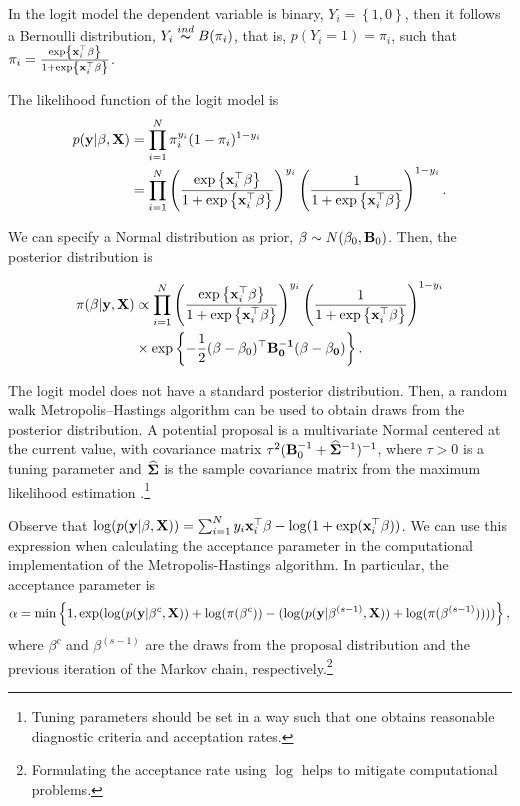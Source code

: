 In the logit model the dependent variable is binary, $Y_i=\left\{1,0\right\}$, then it follows a Bernoulli distribution, $Y_i\stackrel{ind} {\thicksim}B(\pi_i)$, that is, $p(Y_i=1)=\pi_i$, such that $\pi_i=\frac{\exp\left\{{\bf{x}}_i^{\top}\beta\right\}}{1+\exp\left\{{\bf{x}}_i^{\top}\beta\right\}}$.

The likelihood function of the logit model is
\begin{align*}
	p({\bf{y}}|\beta,{\bf{X}})&=\prod_{i=1}^N \pi_i^{y_i}(1-\pi_i)^{1-y_i}\\
	&=\prod_{i=1}^N\left(\frac{\exp\left\{{\bf{x}}_i^{\top}\beta\right\}}{1+\exp\left\{{\bf{x}}_i^{\top}\beta\right\}}\right)^{y_i}\left(\frac{1}{1+\exp\left\{{\bf{x}}_i^{\top}\beta\right\}}\right)^{1-y_i}.
\end{align*}

We can specify a Normal distribution as prior, $\beta\sim N({\bf{\beta}}_0,{\bf{B}}_0)$. Then, the posterior distribution is

\begin{align*}
	\pi(\beta|{\bf{y}},{\bf{X}})&\propto\prod_{i=1}^N\left(\frac{\exp\left\{{\bf{x}}_i^{\top}\beta\right\}}{1+\exp\left\{{\bf{x}}_i^{\top}\beta\right\}}\right)^{y_i}\left(\frac{1}{1+\exp\left\{{\bf{x}}_i^{\top}\beta\right\}}\right)^{1-y_i}\\
	&\times\exp\left\{-\frac{1}{2}(\beta-\beta_0)^{\top}\bf{B}_0^{-1}(\beta-\beta_0)\right\}.
\end{align*}

The logit model does not have a standard posterior distribution. Then, a random walk Metropolis--Hastings algorithm can be used to obtain draws from the posterior distribution. A potential proposal is a multivariate Normal centered at the current value, with covariance matrix $\tau^2({\bf{B}}_0^{-1}+\widehat{{\bf{\Sigma}}}^{-1})^{-1}$, where $\tau>0$ is a tuning parameter and $\widehat{\bf{\Sigma}}$ is the sample covariance matrix from the maximum likelihood estimation \cite{Martin2011}.\footnote{Tuning parameters should be set in a way such that one obtains reasonable diagnostic criteria and acceptation rates.}

Observe that $\log(p({\bf{y}}|\beta,{\bf{X}}))=\sum_{i=1}^Ny_i{\bf{x}}_i^{\top}\beta-\log(1+\exp({\bf{x}}_i^{\top}\beta))$. We can use this expression when calculating the acceptance parameter in the computational implementation of the Metropolis-Hastings algorithm. In particular, the acceptance parameter is \begin{equation*}
	\alpha=\min\left\{1, \exp(\log(p({\bf{y}}|\beta^{c},{\bf{X}}))+\log(\pi(\beta^c))-(\log(p({\bf{y}}|\beta^{(s-1)},{\bf{X}}))+\log(\pi(\beta^{(s-1)}))))\right\},
\end{equation*}
where $\beta^c$ and $\beta^{(s-1)}$ are the draws from the proposal distribution and the previous iteration of the Markov chain, respectively.\footnote{Formulating the acceptance rate using $\log$ helps to mitigate computational problems.}\\

